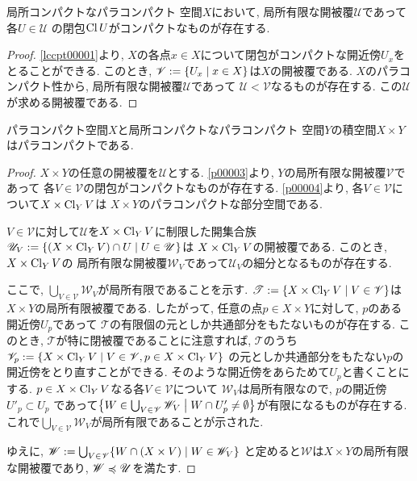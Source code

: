 \documentclass[uplatex, dvipdfmx, a4paper, 12pt, class=jsbook, crop=false]{standalone}
\begin{document}
\begin{lemma}
	\label{p00003}
	局所コンパクトなパラコンパクト  空間$ X $において,
	局所有限な開被覆$ \mathscr{U} $であって各$ U \in \mathscr{U} $
	の閉包$ \mathop{\mathrm{Cl}}\nolimits{U} $がコンパクトなものが存在する.
\end{lemma}

\begin{proof}
	\cref{lccpt00001}より, $ X $の各点$ x \in X $について閉包がコンパクトな開近傍$ U_x $をとることができる.
	このとき, $ \mathscr{V} \defeq \setcomp{U_x}{x \in X} $は$ X $の開被覆である.
	$ X $のパラコンパクト性から, 局所有限な開被覆$ \mathscr{U} $であって
	$ \mathscr{U} < \mathscr{V} $なるものが存在する.
	この$ \mathscr{U} $が求める開被覆である.
\end{proof}

\begin{proposition}
	パラコンパクト空間$ X $と局所コンパクトなパラコンパクト  空間$ Y $の積空間$ X \times Y $はパラコンパクトである.
\end{proposition}

\begin{proof}
	$ X \times Y $の任意の開被覆を$ \mathscr{U} $とする.
	\cref{p00003}より, $ Y $の局所有限な開被覆$ \mathscr{V} $であって
	各$ V \in \mathscr{V} $の閉包がコンパクトなものが存在する.
	\cref{p00004}より, 各$ V \in \mathscr{V} $について$ X \times \mathop{\mathrm{Cl}}\nolimits_Y V $は
	$ X \times Y $のパラコンパクトな部分空間である.

	$ V \in \mathscr{V} $に対して$ \mathscr{U} $を$ X \times \mathop{\mathrm{Cl}}\nolimits_Y V $に制限した開集合族
	$ \mathscr{U}_V \defeq \setcomp{(X \times \topcl_Y V) \cap U}{U \in \mathscr{U}} $は
	$ X \times \mathop{\mathrm{Cl}}\nolimits_Y V $の開被覆である. このとき, $ X \times \mathop{\mathrm{Cl}}\nolimits_Y V $の
	局所有限な開被覆$ \mathscr{W}_V $であって$ \mathscr{U}_V $の細分となるものが存在する.

	ここで, $ \bigcup_{V \in \mathscr{V}} \mathscr{W}_V $が局所有限であることを示す.
	$ \mathscr{T} \defeq \setcomp{X \times \topcl_Y V}{V \in \mathscr{V}} $は$ X \times Y $の局所有限被覆である.
	したがって, 任意の点$ p \in X \times Y $に対して, $ p $のある開近傍$ U_p $であって
	$ \mathscr{T} $の有限個の元としか共通部分をもたないものが存在する.
	このとき, $ \mathscr{T} $が特に閉被覆であることに注意すれば,
	$ \mathscr{T} $のうち
	$ \mathscr{V}_p \defeq \setcomp{X \times \topcl_Y V}{V \in \mathscr{V},
	p \in X \times \topcl_Y V} $
	の元としか共通部分をもたない$ p $の開近傍をとり直すことができる.
	そのような開近傍をあらためて$ U_p $と書くことにする.
	$ p \in X \times \mathop{\mathrm{Cl}}\nolimits_Y V $なる各$ V \in \mathscr{V} $について
	$ \mathscr{W}_V $は局所有限なので, $ p $の開近傍$ U'_p \subset U_p $
	であって$ \setcomp{W \in \bigcup_{V \in \mathscr{V}} \mathscr{W}_V}
	{W \cap U'_p \neq \emptyset} $が有限になるものが存在する.
	これで$ \bigcup_{V \in \mathscr{V}} \mathscr{W}_V $が局所有限であることが示された.

	ゆえに, $ \mathscr{W} \defeq \bigcup_{V \in \mathscr{V}} \setcomp{W \cap (X \times V)}{W \in \mathscr{W}_V} $
	と定めると$ \mathscr{W} $は$ X \times Y $の局所有限な開被覆であり, $ \mathscr{W} \preccurlyeq \mathscr{U} $を満たす.
\end{proof}
\end{document}
